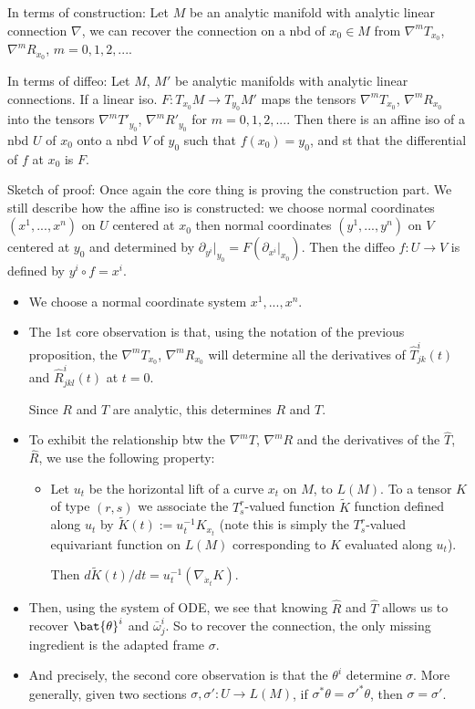 \documentclass{report}
\theoremstyle{definition}
\begin{document}
\begin{itemize}
    In terms of construction: Let $M$ be an analytic manifold with analytic linear connection $\nabla$, we can recover the connection on a nbd of $x_0\in M$ from $\nabla^m T_{x_0}$, $\nabla^m R_{x_0}$, $m=0,1,2,...$.

    In terms of diffeo: Let $M$, $M'$ be analytic manifolds with analytic linear connections. If a linear iso. $F:T_{x_0}M\to T_{y_0}M'$ maps the tensors $\nabla^m T_{x_0}$, $\nabla^m R_{x_0}$ into the tensors $\nabla^mT'_{y_0}$, $\nabla^mR'_{y_0}$ for $m=0,1,2,...$. Then there is an affine iso of a nbd $U$ of $x_0$ onto a nbd $V$ of $y_0$ such that $f(x_0)=y_0$, and st that the differential of $f$ at $x_0$ is $F$.

    Sketch of proof: Once again the core thing is proving the construction part. We still describe how the affine iso is constructed: we choose normal coordinates $(x^1,...,x^n)$ on $U$ centered at $x_0$ then normal coordinates $(y^1,...,y^n)$ on $V$ centered at $y_0$ and determined by $\partial_{y^i}|_{y_0}=F(\partial_{x^i}|_{x_0})$. Then the diffeo $f:U\to V$ is defined by $y^i\circ f=x^i$.
    \begin{itemize}
        \item We choose a normal coordinate system $x^1,...,x^n$.
        \item The 1st core observation is that, using the notation of the previous proposition, the $\nabla^m T_{x_0}$, $\nabla^m R_{x_0}$ will determine all the derivatives of $\hat{T}^i_{jk}(t)$ and $\hat{R}^i_{jkl}(t)$ at $t=0$.

        Since $R$ and $T$ are analytic, this determines $R$ and $T$.
        \item To exhibit the relationship btw the $\nabla^m T$, $\nabla^m R$ and the derivatives of the $\hat{T}$, $\hat{R}$, we use the following property:

        \begin{itemize}
            \item Let $u_t$ be the horizontal lift of a curve $x_t$ on $M$, to $L(M)$. To a tensor $K$ of type $(r,s)$ we associate the $T^r_s$-valued function $\tilde{K}$ function defined along $u_t$ by $\tilde{K}(t):=u_t^{-1}K_{x_t}$ (note this is simply the $T^r_s$-valued equivariant function on $L(M)$ corresponding to $K$ evaluated along $u_t$).

            Then $d\tilde{K}(t)/dt=u_t^{-1}(\nabla_{\dot{x}_t}K)$.
        \end{itemize}
        \item Then, using the system of ODE, we see that knowing $\hat{R}$ and $\hat{T}$ allows us to recover $\bat{\theta}^i$ and $\bar{\omega}^i_j$. So to recover the connection, the only missing ingredient is the adapted frame $\sigma$.
        \item And precisely, the second core observation is that the $\theta^i$ determine $\sigma$. More generally, given two sections $\sigma,\sigma':U\to L(M)$, if $\sigma^*\theta=\sigma'^*\theta$, then $\sigma=\sigma'$.


\end{itemize}
\end{itemize}
\end{document}

